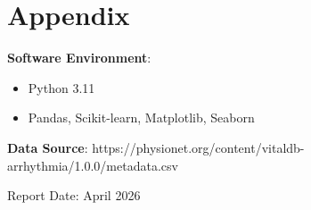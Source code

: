 \documentclass[12pt,a4paper]{article}
\begin{document}
\section*{Appendix}

\textbf{Software Environment}:
\begin{itemize}
    \item Python 3.11
    \item Pandas, Scikit-learn, Matplotlib, Seaborn
\end{itemize}

\textbf{Data Source}: https://physionet.org/content/vitaldb-arrhythmia/1.0.0/metadata.csv

\vfill
\begin{center}
Report Date: April 2026
\end{center}
\end{document}

